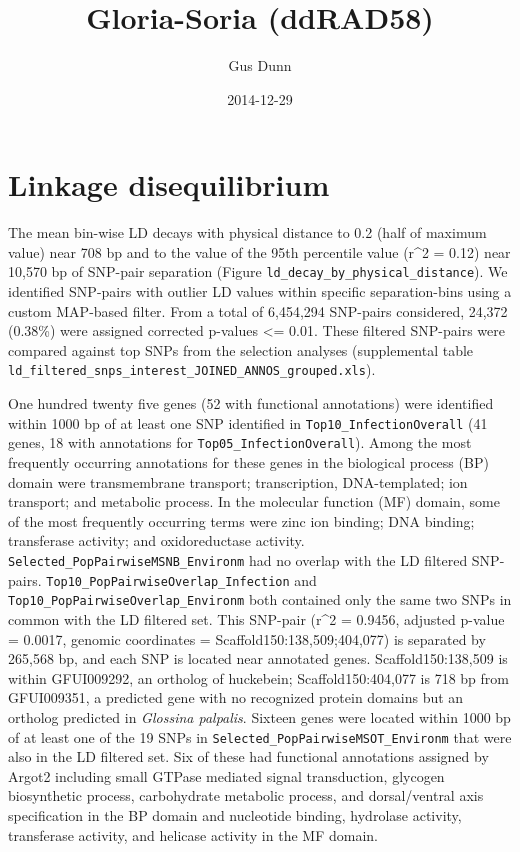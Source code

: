 \documentclass[letterpaper]{scrartcl}
\title{Gloria-Soria (ddRAD58)}
\author{Gus Dunn}
\date{2014-12-29}
\begin{document}
\maketitle

{
\hypersetup{linkcolor=black}
\setcounter{tocdepth}{3}
\tableofcontents
}
\section{Linkage disequilibrium}\label{linkage-disequilibrium}

The mean bin-wise LD decays with physical distance to 0.2 (half of
maximum value) near 708 bp and to the value of the 95th percentile value
(r\^{}2 = 0.12) near 10,570 bp of SNP-pair separation (Figure
\texttt{ld\_decay\_by\_physical\_distance}). We identified SNP-pairs
with outlier LD values within specific separation-bins using a custom
MAP-based filter. From a total of 6,454,294 SNP-pairs considered, 24,372
(0.38\%) were assigned corrected p-values \textless{}= 0.01. These
filtered SNP-pairs were compared against top SNPs from the selection
analyses (supplemental table
\texttt{ld\_filtered\_snps\_interest\_JOINED\_ANNOS\_grouped.xls}).

One hundred twenty five genes (52 with functional annotations) were
identified within 1000 bp of at least one SNP identified in
\texttt{Top10\_InfectionOverall} (41 genes, 18 with annotations for
\texttt{Top05\_InfectionOverall}). Among the most frequently occurring
annotations for these genes in the biological process (BP) domain were
transmembrane transport; transcription, DNA-templated; ion transport;
and metabolic process. In the molecular function (MF) domain, some of
the most frequently occurring terms were zinc ion binding; DNA binding;
transferase activity; and oxidoreductase activity.
\texttt{Selected\_PopPairwiseMSNB\_Environm} had no overlap with the LD
filtered SNP-pairs. \texttt{Top10\_PopPairwiseOverlap\_Infection} and
\texttt{Top10\_PopPairwiseOverlap\_Environm} both contained only the
same two SNPs in common with the LD filtered set. This SNP-pair (r\^{}2
= 0.9456, adjusted p-value = 0.0017, genomic coordinates =
Scaffold150:138,509;404,077) is separated by 265,568 bp, and each SNP is
located near annotated genes. Scaffold150:138,509 is within GFUI009292,
an ortholog of huckebein; Scaffold150:404,077 is 718 bp from GFUI009351,
a predicted gene with no recognized protein domains but an ortholog
predicted in \emph{Glossina palpalis}. Sixteen genes were located within
1000 bp of at least one of the 19 SNPs in
\texttt{Selected\_PopPairwiseMSOT\_Environm} that were also in the LD
filtered set. Six of these had functional annotations assigned by Argot2
including small GTPase mediated signal transduction, glycogen
biosynthetic process, carbohydrate metabolic process, and dorsal/ventral
axis specification in the BP domain and nucleotide binding, hydrolase
activity, transferase activity, and helicase activity in the MF domain.
\end{document}
